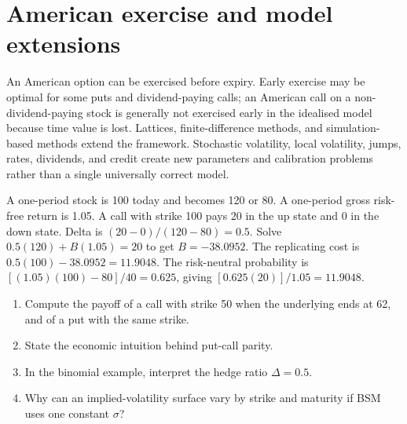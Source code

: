 \section{American exercise and model extensions}
An American option can be exercised before expiry. Early exercise may be optimal for some puts and dividend-paying calls; an American call on a non-dividend-paying stock is generally not exercised early in the idealised model because time value is lost. Lattices, finite-difference methods, and simulation-based methods extend the framework. Stochastic volatility, local volatility, jumps, rates, dividends, and credit create new parameters and calibration problems rather than a single universally correct model.

\begin{worked}
A one-period stock is 100 today and becomes 120 or 80. A one-period gross risk-free return is 1.05. A call with strike 100 pays 20 in the up state and 0 in the down state. Delta is $(20-0)/(120-80)=0.5$. Solve $0.5(120)+B(1.05)=20$ to get $B=-38.0952$. The replicating cost is $0.5(100)-38.0952=11.9048$. The risk-neutral probability is $[(1.05)(100)-80]/40=0.625$, giving $[0.625(20)]/1.05=11.9048$.
\end{worked}

\begin{exerciseblock}
\begin{enumerate}
  \item Compute the payoff of a call with strike 50 when the underlying ends at 62, and of a put with the same strike.
  \item State the economic intuition behind put-call parity.
  \item In the binomial example, interpret the hedge ratio $\Delta=0.5$.
  \item Why can an implied-volatility surface vary by strike and maturity if BSM uses one constant $\sigma$?
\end{enumerate}
\end{exerciseblock}

